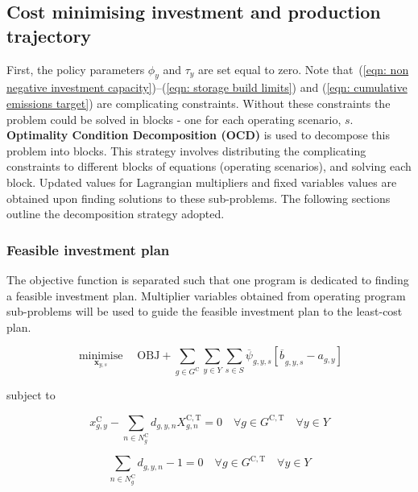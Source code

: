 \documentclass{article}
\newcommand{\sGeneratorsCandidate}{G^{\mathrm{C}}}
\newcommand{\sGeneratorsCandidateThermal}{G^{\mathrm{C,T}}}
\newcommand{\sYears}{Y}
\newcommand{\sScenarios}{S}
\newcommand{\sInvestmentSizeOptions}{N^{\mathrm{C}}}
\newcommand{\sInvestmentSizeOptionsGenerator}[1][\iGenerator]{\sInvestmentSizeOptions_{#1}}
\newcommand{\iGenerator}{g}
\newcommand{\iYear}{y}
\newcommand{\iScenario}{s}
\newcommand{\iInvestmentSizeOption}{n}
\newcommand{\cInvestmentSize}{X^{\mathrm{C,T}}_{\iGenerator,\iInvestmentSizeOption}}
\newcommand{\cObjectiveFunction}{\mathrm{OBJ}}
\newcommand{\vBaseline}[1][\iYear]{\phi_{#1}}
\newcommand{\vPermitPrice}[1][\iYear]{\tau_{#1}}
\newcommand{\vInstalledCapacity}[1][\iGenerator,\iYear]{x^{\mathrm{C}}_{#1}}
\newcommand{\vInvestmentSizeIndicator}[1][\iGenerator,\iYear,\iInvestmentSizeOption]{d_{#1}}
\newcommand{\vInstalledCapacityTotal}[1][\iGenerator,\iYear]{a_{#1}}
\newcommand{\vInstalledCapacityTotalScenario}[1][\iGenerator,\iYear,\iScenario]{b_{#1}}
\DeclareMathOperator*{\minimise}{minimise}
\begin{document}
\subsection{Cost minimising investment and production trajectory}
First, the policy parameters $\vBaseline$ and $\vPermitPrice$ are set equal to zero. Note that~(\ref{eqn: non negative investment capacity})--(\ref{eqn: storage build limits}) and (\ref{eqn: cumulative emissions target}) are complicating constraints. Without these constraints the problem could be solved in blocks - one for each operating scenario, $\iScenario$. \textbf{Optimality Condition Decomposition (OCD)} is used to decompose this problem into blocks. This strategy involves distributing the complicating constraints to different blocks of equations (operating scenarios), and solving each block. Updated values for Lagrangian multipliers and fixed variables values are obtained upon finding solutions to these sub-problems. The following sections outline the decomposition strategy adopted.

\subsubsection{Feasible investment plan}
The objective function is separated such that one program is dedicated to finding a feasible investment plan. Multiplier variables obtained from operating program sub-problems will be used to guide the feasible investment plan to the least-cost plan.

\begin{equation}
\minimise\limits_{\bm{x}_{\iYear,\iScenario}} \quad \cObjectiveFunction + \sum\limits_{\iGenerator \in \sGeneratorsCandidate}\sum\limits_{\iYear \in \sYears}\sum\limits_{\iScenario \in \sScenarios} \overline{\psi}_{\iGenerator,\iYear,\iScenario}\left[\overline{\vInstalledCapacityTotalScenario[]}_{\iGenerator,\iYear,\iScenario} - \vInstalledCapacityTotal\right]
\end{equation}

subject to

\begin{equation}
\vInstalledCapacity - \sum\limits_{\iInvestmentSizeOption \in \sInvestmentSizeOptionsGenerator} \vInvestmentSizeIndicator \cInvestmentSize = 0 \quad \forall \iGenerator \in \sGeneratorsCandidateThermal \quad \forall \iYear \in \sYears 
\end{equation}

\begin{equation}
\sum\limits_{\iInvestmentSizeOption \in \sInvestmentSizeOptionsGenerator} \vInvestmentSizeIndicator - 1 = 0 \quad \forall \iGenerator \in \sGeneratorsCandidateThermal \quad \forall \iYear \in \sYears
\end{equation}
\end{document}
